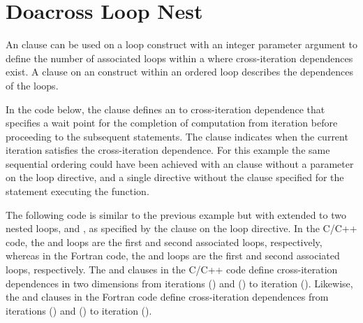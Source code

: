 \pagebreak
\section{Doacross Loop Nest}
\label{sec:doacross}

An  clause can be used on a loop construct with an integer
parameter argument to define the number of associated loops within 
a  where cross-iteration dependences exist.
A  clause on an  construct within an ordered 
loop describes the dependences of the  loops. 

In the code below, the  clause defines an  
to  cross-iteration dependence that specifies a wait point for 
the completion of computation from iteration  before proceeding 
to the subsequent statements. The  clause indicates 
when the current iteration satisfies the cross-iteration dependence.
For this example the same sequential ordering could have been achieved 
with an  clause without a parameter on the loop directive, 
and a single  directive without the  clause
specified for the statement executing the  function.



The following code is similar to the previous example but with 
 extended to two nested loops,  and , 
as specified by the  clause on the loop directive. 
In the C/C++ code, the  and  loops are the first and
second associated loops, respectively, whereas
in the Fortran code, the  and  loops are the first and
second associated loops, respectively.
The  and  clauses in 
the C/C++ code define cross-iteration dependences in two dimensions from 
iterations () and () to iteration ().  
Likewise, the  and  clauses 
in the Fortran code define cross-iteration dependences from iterations 
() and () to iteration ().




